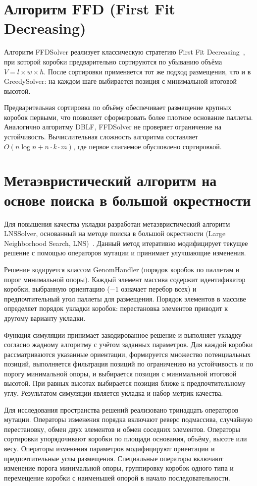 \section{Алгоритм FFD (First Fit Decreasing)}

Алгоритм FFDSolver реализует классическую стратегию First Fit Decreasing~\cite{CoffmanFFD1996}, при которой коробки предварительно сортируются по убыванию объёма $V = l \times w \times h$. После сортировки применяется тот же подход размещения, что и в GreedySolver: на каждом шаге выбирается позиция с минимальной итоговой высотой.

Предварительная сортировка по объёму обеспечивает размещение крупных коробок первыми, что позволяет сформировать более плотное основание паллеты. Аналогично алгоритму DBLF, FFDSolver не проверяет ограничение на устойчивость. Вычислительная сложность алгоритма составляет $O(n \log n + n \cdot k \cdot m)$, где первое слагаемое обусловлено сортировкой.

\section{Метаэвристический алгоритм на основе поиска в большой окрестности}

Для повышения качества укладки разработан метаэвристический алгоритм LNSSolver, основанный на методе поиска в большой окрестности (Large Neighborhood Search, LNS)~\cite{Pisinger2005}. Данный метод итеративно модифицирует текущее решение с помощью операторов мутации и принимает улучшающие изменения.

Решение кодируется классом GenomHandler (порядок коробок по паллетам и порог минимальной опоры). Каждый элемент массива содержит идентификатор коробки, выбранную ориентацию ($-1$ означает перебор всех) и предпочтительный угол паллеты для размещения. Порядок элементов в массиве определяет порядок укладки коробок: перестановка элементов приводит к другому варианту укладки.

Функция симуляции принимает закодированное решение и выполняет укладку согласно жадному алгоритму с учётом заданных параметров. Для каждой коробки рассматриваются указанные ориентации, формируется множество потенциальных позиций, выполняется фильтрация позиций по ограничению на устойчивость и по порогу минимальной опоры, и выбирается позиция с минимальной итоговой высотой. При равных высотах выбирается позиция ближе к предпочтительному углу. Результатом симуляции является укладка и набор метрик качества.

Для исследования пространства решений реализовано тринадцать операторов мутации. Операторы изменения порядка включают реверс подмассива, случайную перестановку, обмен двух элементов и обмен соседних элементов. Операторы сортировки упорядочивают коробки по площади основания, объёму, высоте или весу. Операторы изменения параметров модифицируют ориентации и предпочтительные углы размещения. Специальные операторы включают изменение порога минимальной опоры, группировку коробок одного типа и перемещение коробки с наименьшей опорой в начало последовательности.

